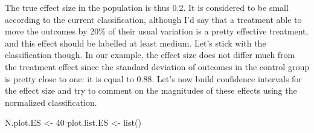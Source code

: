 \documentclass[
]{book}
\newenvironment{Shaded}{\begin{snugshade}}{\end{snugshade}}
\newcommand{\DecValTok}[1]{\textcolor[rgb]{0.00,0.00,0.81}{#1}}
\newcommand{\FunctionTok}[1]{\textcolor[rgb]{0.00,0.00,0.00}{#1}}
\newcommand{\NormalTok}[1]{#1}
\newcommand{\OtherTok}[1]{\textcolor[rgb]{0.56,0.35,0.01}{#1}}
\theoremstyle{definition}
\theoremstyle{definition}
\theoremstyle{definition}
\theoremstyle{definition}
\theoremstyle{remark}
\begin{document}
The true effect size in the population is thus 0.2.
It is considered to be small according to the current classification, although I'd say that a treatment able to move the outcomes by 20\% of their usual variation is a pretty effective treatment, and this effect should be labelled at least medium.
Let's stick with the classification though.
In our example, the effect size does not differ much from the treatment effect since the standard deviation of outcomes in the control group is pretty close to one: it is equal to 0.88.
Let's now build confidence intervals for the effect size and try to comment on the magnitudes of these effects using the normalized classification.

\begin{Shaded}
\begin{Highlighting}[]
\NormalTok{N.plot.ES }\OtherTok{\textless{}{-}} \DecValTok{40}
\NormalTok{plot.list.ES }\OtherTok{\textless{}{-}} \FunctionTok{list}\NormalTok{()}


\end{Highlighting}
\end{Shaded}
\end{document}
